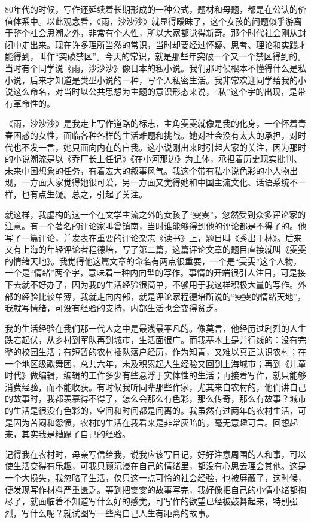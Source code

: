 \documentclass[fontset=fandol,12pt,a5paper]{ctexbook}
\begin{document}
80年代的时候，写作还延续着长期形成的一种公式，题材和母题，都是在公认的价值体系中。以此观念看，《雨，沙沙沙》就显得暧昧了，这个女孩的问题似乎游离于整个社会思潮之外，非常有个人性，所以大家都觉得新奇。那个时代社会刚从封闭中走出来。现在许多理所当然的常识，当时却要经过怀疑、思考、理论和实践才能得到，叫作“突破禁区”。今天的常识，就是那些年突破一个又一个禁区得到的。当时有个同学说《雨，沙沙沙》像日本的私小说。我们那时候根本不懂得什么是私小说，后来才知道是类型小说的一种，写个人私密生活。我非常欢迎同学给我的小说这么命名，对当时以公共思想为主题的意识形态来说，“私”这个字的出现，是带有革命性的。

《雨，沙沙沙》是我走上写作道路的标志，主角雯雯就像是我的化身，一个怀着青春困惑的女性，面临各种各样的生活难题和挑战。她对社会没有太大的承担，对时代也不发一言，她只面向内在的自我。这小说刚出来时引起大家的关注，因为那时的小说潮流是以《乔厂长上任记》《在小河那边》为主体，承担着历史现实批判、未来中国想象的任务，有着宏大的叙事风气。我这个带有私小说色彩的小人物出现，一方面大家觉得她很可爱，另一方面又觉得她和中国主流文化、话语系统不一样，也有点生疑。总之，引起了关注。

就这样，我虚构的这一个在文学主流之外的女孩子“雯雯”，忽然受到众多评论家的注意。有一个著名的评论家叫曾镇南，当时谁能够得到他的评论都是不得了的。他写了一篇评论，并发表在重要的评论杂志《读书》上，题目叫《秀出于林》。后来又有上海的年轻评论者程德培，写了第二篇，这篇评论文章的题目直接就叫《雯雯的情绪天地》。我觉得他这篇文章的命名有两点很重要，一个是“雯雯”这个人物，一个是“情绪”两个字，意味着一种内向型的写作。事情的开端很引人注目，可是接下去就不好办了，因为我的生活经验很简单，不够用于我这样积极大量的写作。外部的经验比较单薄，我就走向内部，就是评论家程德培所说的“雯雯的情绪天地”，我就写情绪，可没有经验的支持，内部生活也会变得贫乏。

我的生活经验在我们那一代人之中是最浅最平凡的。像莫言，他经历过剧烈的人生跌宕起伏，从乡村到军队再到城市，生活面很广。而我基本上是并行线的：没有完整的校园生活；有短暂的农村插队落户经历，作为知青，又难以真正认识农村；在一个地区级歌舞团，总共六年，未及积累起人生经验又回到上海城市；再到《儿童时代》做编辑，编辑的工作多少有些悬浮于实体性的生活；再接着写作，就只能够消费经验，而不能收获。有时候我听同辈那些作家，尤其来自农村的，他们讲自己的故事时，我都羡慕得不得了，怎么会那么有色彩，那么传奇，那么有故事？城市的生活是很没有色彩的，空间和时间都是间离的。我虽然有过两年的农村生活，可是因为苦闷和怨愤，农村的生活在我看来是非常灰暗的，毫无意趣可言。回想起来，其实我是糟蹋了自己的经验。

记得我在农村时，母亲写信给我，说我应该写日记，好好注意周围的人和事，可以使生活变得有乐趣，可我只顾沉浸在自己的情绪里，都没有心思去理会其他。这是一个大损失，我忽略了生活，仅只这一点可怜的社会经验，也被屏蔽了，这时候，便发现写作材料严重匮乏。等到把雯雯的故事写完，我好像把自己的小情小绪都掏尽了，就面临着不知道写什么好的感觉，可写作的欲望已经被鼓舞起来，特别强烈，写什么呢？就试图写一些离自己人生有距离的故事。
\end{document}
